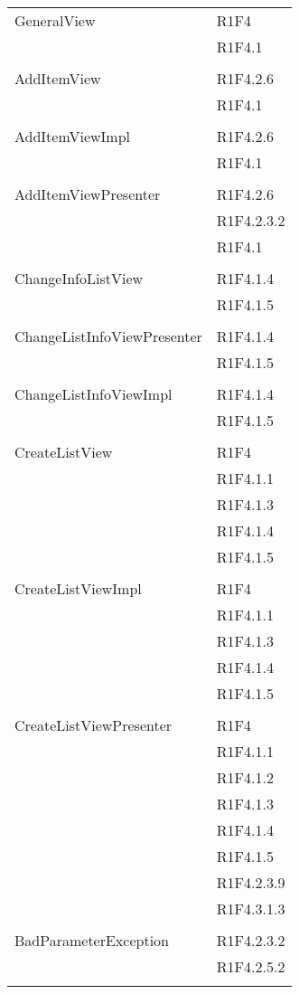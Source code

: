 \begin{center}
\begin{longtable}{|p{7cm}|p{7cm}|}
		GeneralView & R1F4 \\ & R1F4.1 \\ & \\ \hline
		AddItemView & R1F4.2.6 \\ & R1F4.1 \\ & \\ \hline
		AddItemViewImpl & R1F4.2.6 \\ & R1F4.1 \\ & \\ \hline
		AddItemViewPresenter & R1F4.2.6 \\ & R1F4.2.3.2 \\ & R1F4.1 \\ & \\ \hline
		ChangeInfoListView & R1F4.1.4 \\ & R1F4.1.5 \\ & \\ \hline
		ChangeListInfoViewPresenter & R1F4.1.4 \\ & R1F4.1.5 \\ & \\ \hline
		ChangeListInfoViewImpl & R1F4.1.4 \\ & R1F4.1.5 \\ & \\ \hline
		CreateListView & R1F4 \\ & R1F4.1.1 \\ & R1F4.1.3 \\ & R1F4.1.4 \\ & R1F4.1.5 \\ & \\ \hline
		CreateListViewImpl & R1F4 \\ & R1F4.1.1 \\ & R1F4.1.3 \\ & R1F4.1.4 \\ & R1F4.1.5 \\ & \\ \hline
		CreateListViewPresenter & R1F4 \\ & R1F4.1.1 \\ & R1F4.1.2 \\ & R1F4.1.3 \\ & R1F4.1.4 \\ & R1F4.1.5 \\ & R1F4.2.3.9 \\ & R1F4.3.1.3 \\ & \\ \hline
		BadParameterException & R1F4.2.3.2 \\ & R1F4.2.5.2 \\ & \\ \hline

\end{longtable}
\end{center}

